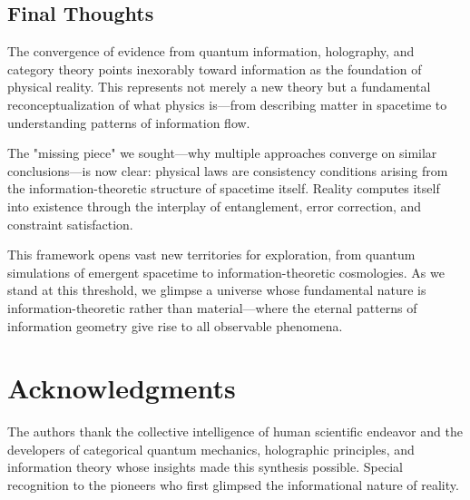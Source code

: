 \documentclass[11pt,a4paper]{article}
\theoremstyle{definition}
\begin{document}
\subsection{Final Thoughts}

The convergence of evidence from quantum information, holography, and category theory points inexorably toward information as the foundation of physical reality. This represents not merely a new theory but a fundamental reconceptualization of what physics is—from describing matter in spacetime to understanding patterns of information flow.

The "missing piece" we sought—why multiple approaches converge on similar conclusions—is now clear: physical laws are consistency conditions arising from the information-theoretic structure of spacetime itself. Reality computes itself into existence through the interplay of entanglement, error correction, and constraint satisfaction.

This framework opens vast new territories for exploration, from quantum simulations of emergent spacetime to information-theoretic cosmologies. As we stand at this threshold, we glimpse a universe whose fundamental nature is information-theoretic rather than material—where the eternal patterns of information geometry give rise to all observable phenomena.

\section*{Acknowledgments}

The authors thank the collective intelligence of human scientific endeavor and the developers of categorical quantum mechanics, holographic principles, and information theory whose insights made this synthesis possible. Special recognition to the pioneers who first glimpsed the informational nature of reality.
\end{document}
